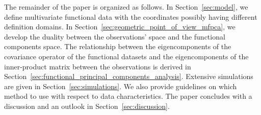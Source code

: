 The remainder of the paper is organized as follows. In Section~\ref{sec:model}, we define multivariate functional data with the coordinates possibly having different definition domains. In Section~\ref{sec:geometric_point_of_view_mfpca}, we develop the duality between the observations' space and the functional components space. The relationship between the eigencomponents of the covariance operator of the functional datasets and the eigencomponents of the inner-product matrix between the observations is derived in Section~\ref{sec:functional_principal_components_analysis}. Extensive simulations are given in Section~\ref{sec:simulations}. We also provide guidelines on which method to use with respect to data characteristics. The paper concludes with a discussion and an outlook in Section~\ref{sec:discussion}.

